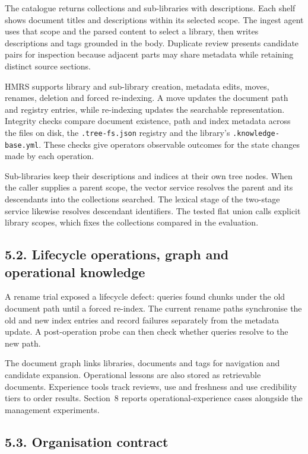 The catalogue returns collections and sub-libraries with descriptions.
Each shelf shows document titles and descriptions within its selected scope.
The ingest agent uses that scope and the parsed content to select a library,
then writes descriptions and tags grounded in the body. Duplicate review
presents candidate pairs for inspection because adjacent parts may share
metadata while retaining distinct source sections.

HMRS supports library and sub-library creation, metadata edits, moves,
renames, deletion and forced re-indexing. A move updates the document path
and registry entries, while re-indexing updates the searchable representation.
Integrity checks compare document existence, path and index metadata across
the files on disk, the \texttt{.tree-fs.json} registry and the library's
\texttt{.knowledge-base.yml}. These checks give operators observable
outcomes for the state changes made by each operation.

Sub-libraries keep their descriptions and indices at their own tree nodes.
When the caller supplies a parent scope, the vector service resolves the
parent and its descendants into the collections searched. The lexical stage
of the two-stage service likewise resolves descendant identifiers. The
tested flat union calls explicit library scopes, which fixes the collections
compared in the evaluation.

\subsection{5.2. Lifecycle operations, graph and operational knowledge}




A rename trial exposed a lifecycle defect: queries found chunks under the
old document path until a forced re-index. The current rename paths
synchronise the old and new index entries and record failures separately
from the metadata update. A post-operation probe can then check whether
queries resolve to the new path.

The document graph links libraries, documents and tags for navigation and
candidate expansion. Operational lessons are also stored as retrievable
documents. Experience tools track reviews, use and freshness and use
credibility tiers to order results. Section~8 reports
operational-experience cases alongside the management experiments.

\subsection{5.3. Organisation contract}



